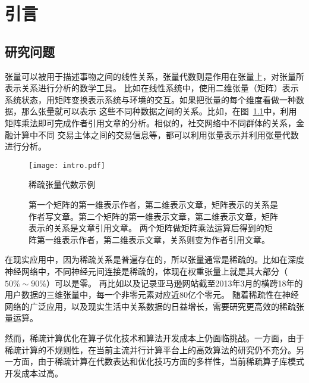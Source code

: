 
\chapter{引言}

\section{研究问题}
张量可以被用于描述事物之间的线性关系，张量代数则是作用在张量上，对张量所表示关系进行分析的数学工具。
比如在线性系统中，使用二维张量（矩阵）表示系统状态，用矩阵变换表示系统与环境的交互。如果把张量的每个维度看做一种数据，那么张量就可以表示
这些不同种数据之间的关系。比如，在图~\ref{fig:intro}中，利用矩阵乘法即可完成作者引用文章的分析。相似的，社交网络中不同群体的关系，金融计算中不同
交易主体之间的交易信息等，都可以利用张量表示并利用张量代数进行分析。
\begin{figure}
  \centering
  \texttt{[image: intro.pdf]}
  \caption{稀疏张量代数示例}
  \caption*{第一个矩阵的第一维表示作者，第二维表示文章，矩阵表示的关系是作者写文章。第二个矩阵的第一维表示文章，第二维表示文章，矩阵表示的关系是文章引用文章。
  两个矩阵做矩阵乘法运算后得到的矩阵第一维表示作者，第二维表示文章，关系则变为作者引用文章。}
  \label{fig:intro}
\end{figure}

在现实应用中，因为稀疏关系是普遍存在的\cite{uzzi2007small}，所以张量通常是稀疏的。比如在深度神经网络中，不同神经元间连接是稀疏的，体现在权重张量上就是其大部分（$50\% \sim 90\%$）可以是零\cite{wang2021dual}。
再比如以及记录亚马逊网站截至2013年3月的横跨18年的用户数据的三维张量中，每一个非零元素对应近80亿个零元\cite{mcauley2013hidden}。
随着稀疏性在神经网络的广泛应用\cite{xiao2022smoothquant}，以及现实生活中关系数据的日益增长，需要研究更高效的稀疏张量运算。

然而，稀疏计算优化在算子优化技术和算法开发成本上仍面临挑战。一方面，由于稀疏计算的不规则性，在当前主流并行计算平台上的高效算法的研究仍不充分。另一方面，由于稀疏计算在代数表达和优化技巧方面的多样性，当前稀疏算子库模式开发成本过高。

